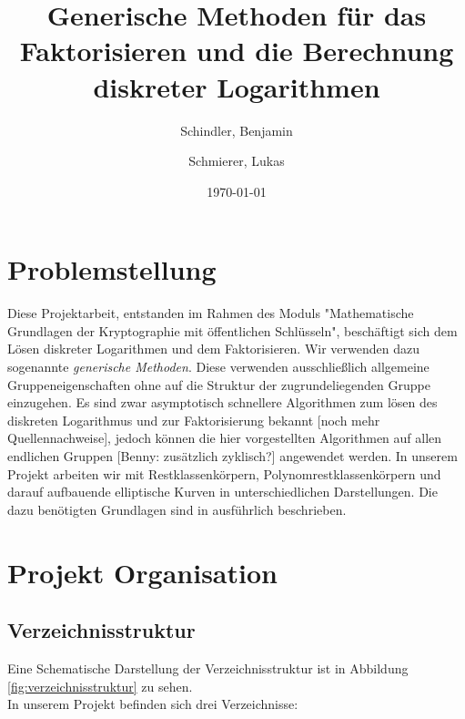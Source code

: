 \documentclass{scrartcl}
\begin{document}
\titlehead{
  Universität Leipzig \\
  Fakultät für Mathematik und Informatik \\
  Institut für Informatik
}
\subject{Projekt Dokumentation}
\title{Generische Methoden für das Faktorisieren und die Berechnung diskreter Logarithmen}
\author{Schindler, Benjamin \and Schmierer, Lukas}
\date{\today}
\publishers{Dr. Claus Diem}
\maketitle

\tableofcontents

\section{Problemstellung}
Diese Projektarbeit, entstanden im Rahmen des Moduls "Mathematische Grundlagen der Kryptographie mit öffentlichen Schlüsseln", beschäftigt sich dem Lösen diskreter Logarithmen und dem Faktorisieren. Wir verwenden dazu sogenannte \emph{generische Methoden}. Diese verwenden ausschließlich allgemeine Gruppeneigenschaften ohne auf die Struktur der zugrundeliegenden Gruppe einzugehen. Es sind zwar asymptotisch schnellere Algorithmen zum lösen des diskreten Logarithmus und zur Faktorisierung bekannt \cite{diem_2011, Adleman_1979}[noch mehr Quellennachweise], jedoch können die hier vorgestellten Algorithmen auf allen endlichen Gruppen [Benny: zusätzlich zyklisch?] angewendet werden. In unserem Projekt arbeiten wir mit Restklassenkörpern, Polynomrestklassenkörpern und darauf aufbauende elliptische Kurven in unterschiedlichen Darstellungen. Die dazu benötigten Grundlagen sind in \cite{Galbraith2012} ausführlich beschrieben. 
\section{Projekt Organisation}
\label{sec:organisation}

\subsection{Verzeichnisstruktur}
\label{sec:verzeichnisstruktur}
Eine Schematische Darstellung der Verzeichnisstruktur ist in Abbildung \ref{fig:verzeichnisstruktur} zu sehen.\\
In unserem Projekt befinden sich drei Verzeichnisse:
\end{document}
